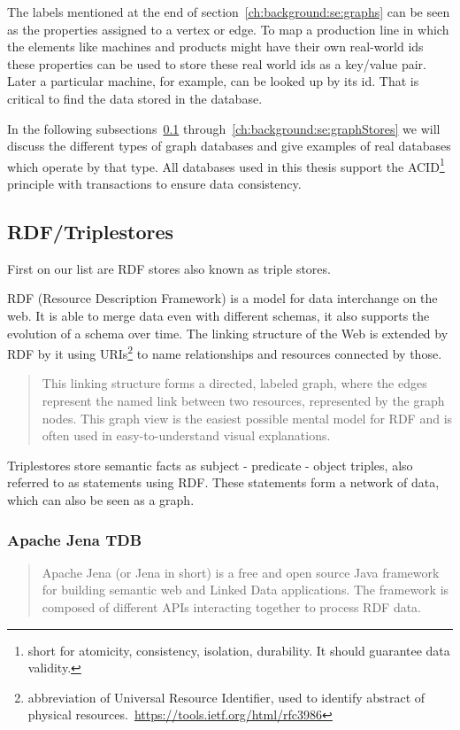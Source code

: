 The labels mentioned at the end of section~\ref{ch:background:se:graphs} can be seen as the properties assigned to a vertex or edge.
To map a production line in which the elements like machines and products might have their own real-world ids these properties can be used to store these real world ids as a key/value pair.
Later a particular machine,
for example,
can be looked up by its id.
That is critical to find the data stored in the database.

In the following subsections~\ref{ch:background:se:rdfTriplestores} through~\ref{ch:background:se:graphStores} we will discuss the different types of graph databases and give examples of real databases which operate by that type.
All databases used in this thesis support the ACID\footnote{short for atomicity, consistency, isolation, durability. It should guarantee data validity.} principle with transactions to ensure data consistency.

\subsection{RDF/Triplestores}
\label{ch:background:se:rdfTriplestores}
First on our list are RDF stores also known as triple stores.

RDF (Resource Description Framework) is a model for data interchange on the web.
It is able to merge data even with different schemas, it also supports the evolution of a schema over time.
The linking structure of the Web is extended by RDF by it using URIs\footnote{abbreviation of Universal Resource Identifier, used to identify abstract of physical resources.~\url{https://tools.ietf.org/html/rfc3986}} to name relationships and resources connected by those.~\cite[4]{Ontotext2014}

\blockquote[\cite{W3C2014}]{This linking structure forms a directed, labeled graph, where the edges represent the named link between two resources, represented by the graph nodes.
This graph view is the easiest possible mental model for RDF and is often used in easy-to-understand visual explanations.}

Triplestores store semantic facts as subject - predicate - object triples,
also referred to as statements using RDF.
These statements form a network of data,
which can also be seen as a graph.~\cite[4]{Ontotext2014}

\subsubsection{Apache Jena TDB}
\label{ch:background:se:apacheJena}
\blockquote[\cite{Apache2015}]{Apache Jena (or Jena in short) is a free and open source Java framework for building semantic web and Linked Data applications.
The framework is composed of different APIs interacting together to process RDF data.}

